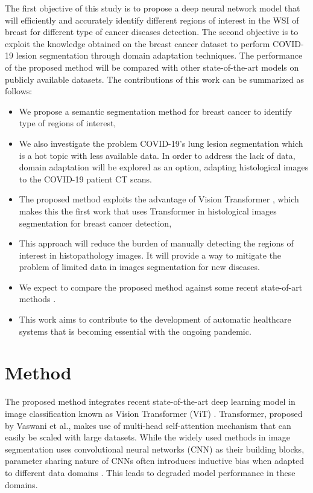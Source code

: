 \documentclass[final]{cvpr}
\begin{document}
The first objective of this study is to propose a deep neural network model that will efficiently and accurately identify different regions of interest in the WSI of breast for different type of cancer diseases detection. The second objective is to exploit the knowledge obtained on the breast cancer dataset to perform COVID-19 lesion segmentation through domain adaptation techniques. The performance of the proposed method will be compared with other state-of-the-art models \cite{chan2019histosegnet, chen2021transunet, Fu_2018, He2020.04.13.20063941} on publicly available datasets. The contributions of this work can be summarized as follows:
\begin{itemize}
    \item We propose a semantic segmentation method for breast cancer to identify type of regions of interest,
    \item We also investigate the problem COVID-19's lung lesion segmentation which is a hot topic with less available data. In order to address the lack of data, domain adaptation will be explored as an option, adapting histological images to the COVID-19 patient CT scans.
    \item The proposed method exploits the advantage of Vision Transformer \cite{dosovitskiy2020image}, which makes this the first work that uses Transformer in histological images segmentation for breast cancer detection,
    \item This approach will reduce the burden of manually detecting the regions of interest in histopathology images. It will provide a way to mitigate the problem of limited data in images segmentation for new diseases.
    \item We expect to compare the proposed method against some recent state-of-art methods \cite{dosovitskiy2020image,touvron2021training}.
    \item This work aims to contribute to the development of automatic healthcare systems that is becoming essential with the ongoing pandemic.
\end{itemize}


\section{Method}
The proposed method integrates recent state-of-the-art deep learning model in image classification known as Vision Transformer (ViT) \cite{dosovitskiy2020image}. Transformer, proposed by Vaswani et al.\cite{vaswani2017attention}, makes use of multi-head self-attention mechanism that can easily be scaled with large datasets. While the widely used methods in image segmentation uses convolutional neural networks (CNN) as their building blocks, parameter sharing nature of CNNs often introduces inductive bias when adapted to different data domains \cite{cohen2017inductive}. This leads to degraded model performance in these domains.
\end{document}
